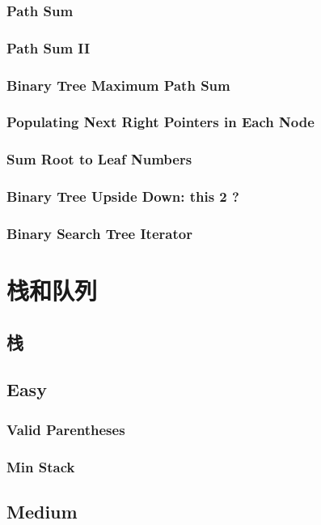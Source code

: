 \documentclass[11pt]{book}
\begin{document}
\subsection{Path Sum}
\label{sec-4-4-3}
\subsection{Path Sum II}
\label{sec-4-4-4}
\subsection{Binary Tree Maximum Path Sum}
\label{sec-4-4-5}
\subsection{Populating Next Right Pointers in Each Node}
\label{sec-4-4-6}

\subsection{Sum Root to Leaf Numbers}
\label{sec-4-4-7}
\subsection{Binary Tree Upside Down: this 2 ?}
\label{sec-4-4-8}
\subsection{Binary Search Tree Iterator}
\label{sec-4-4-9}
\chapter{栈和队列}
\label{sec-5}
\section{栈}
\label{sec-5-1}
\section{Easy}
\label{sec-5-2}
\subsection{Valid Parentheses}
\label{sec-5-2-1}
\subsection{Min Stack}
\label{sec-5-2-2}
\section{Medium}
\label{sec-5-3}
\end{document}
